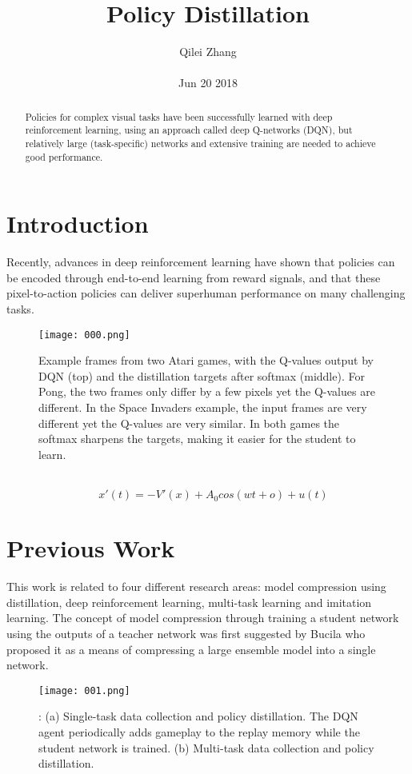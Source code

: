 \documentclass[30pt,twocolumn,letterpaper]{article}
\author{Qilei Zhang\\\\
Jun 20 2018}
\title{Policy Distillation}
\begin{document}
\maketitle
\begin{abstract}
  Policies for complex visual tasks have been successfully learned with deep reinforcement learning, using an approach called deep Q-networks (DQN), but relatively large (task-specific) networks and extensive training are needed to achieve good performance.
\end{abstract}
\section{Introduction}
Recently, advances in deep reinforcement learning have shown that policies can be encoded through end-to-end learning from reward signals\cite{Gaminibandara1976Synthesis}, and that these pixel-to-action policies can deliver superhuman performance on many challenging tasks\cite{Kupferberg1968The}. \\
\begin{figure}[htbp]
\small
\centering
\texttt{[image: 000.png]}
\caption{Example frames from two Atari games, with the Q-values output by DQN (top) and the distillation
targets after softmax (middle). For Pong, the two frames only differ by a few pixels yet the Q-values are
different. In the Space Invaders example, the input frames are very different yet the Q-values are very similar.
In both games the softmax sharpens the targets, making it easier for the student to learn.}
\label{fig:lable}
\end{figure}\\
\begin{equation}
\quad x'(t)=-V'(x)+A_0cos(wt+o)+u(t)
\end{equation}
\section{Previous Work}
This work is related to four different research areas: model compression using distillation, deep reinforcement learning\cite{Li1998Adaptive}, multi-task learning and imitation learning. The concept of model compression through training a student network using the outputs of a teacher network was first suggested by Bucila who proposed it as a means of compressing a large ensemble model into a single network\cite{Wozny2002Optimisation}.\\
\begin{figure}[htbp]
\small
\centering
\texttt{[image: 001.png]}
\caption{: (a) Single-task data collection and policy distillation. The DQN agent periodically adds gameplay to
the replay memory while the student network is trained. (b) Multi-task data collection and policy distillation.
}
\label{fig:lable}
\end{figure}\\
\end{document}
